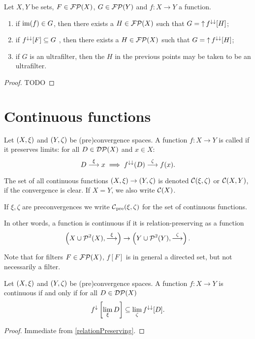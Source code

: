 \begin{proposition} \label{preimageFilter}
Let $X,Y$ be sets, $F\in\operatorname{\mathcal{FP}}(X)$, $G\in\operatorname{\mathcal{FP}}(Y)$ and $f: X\to Y$ a function.
\begin{enumerate}
\item if $\operatorname{im}(f)\in G$, then there exists a $H\in\operatorname{\mathcal{FP}}(X)$ such that $G = \operatorname{\uparrow} f^{\downarrow\downarrow}[H]$;
\item if $f^{\downarrow\downarrow}[F]\subseteq G$ , then there exists a $H\in\operatorname{\mathcal{FP}}(X)$ such that $G = \operatorname{\uparrow} f^{\downarrow\downarrow}[H]$;
\item if $G$ is an ultrafilter, then the $H$ in the previous points may be taken to be an ultrafilter.
\end{enumerate}
\end{proposition}
\begin{proof}
TODO
\end{proof}

\section{Continuous functions}
\begin{definition}
Let $\left( X,\xi \right)$ and $\left( Y,\zeta \right)$ be (pre)convergence spaces. A function $f: X\to Y$ is called  if it preserves limits: for all $D \in \operatorname{\mathcal{DP}}(X)$ and $x\in X$:
\[ D \overset{\xi}{\longrightarrow} x \implies f^{\downarrow\downarrow}(D) \overset{\zeta}{\longrightarrow} f(x). \]

The set of all continuous functions $\left( X,\xi \right) \to \left( Y,\zeta \right)$ is denoted $\operatorname{\mathcal{C}}(\xi, \zeta)$ or $\operatorname{\mathcal{C}}(X,Y)$, if the convergence is clear. If $X=Y$, we also write $\operatorname{\mathcal{C}}(X)$.

If $\xi,\zeta$ are preconvergences we write $\operatorname{\mathcal{C}}_\text{pre}(\xi, \zeta)$ for the set of continuous functions.
\end{definition}
In other words, a function is continuous if it is relation-preserving as a function
\[ \left( X \cup \operatorname{\mathcal{P}}^2(X), \overset{\xi}{\longrightarrow} \right) \to \left( Y \cup \operatorname{\mathcal{P}}^2(Y), \overset{\zeta}{\longrightarrow} \right). \]

Note that for filters $F\in\operatorname{\mathcal{FP}}(X)$, $f[F]$ is in general a directed set, but not necessarily a filter.

\begin{lemma}
Let $\left( X,\xi \right)$ and $\left( Y,\zeta \right)$ be (pre)convergence spaces. A function $f: X\to Y$ is continuous \textup{if and only if} for all $D \in \operatorname{\mathcal{DP}}(X)$
\[ f^{\downarrow}\left[\lim_\xi D \right] \subseteq \lim_\zeta f^{\downarrow\downarrow}[D]. \]
\end{lemma}
\begin{proof}
Immediate from \ref{relationPreserving}.
\end{proof}

